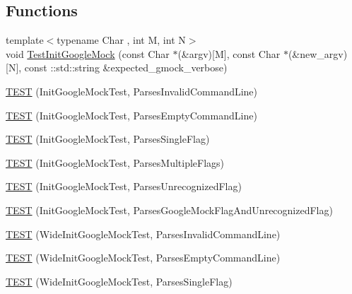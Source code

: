 \subsection*{Functions}
\begin{DoxyCompactItemize}
\item 
{\footnotesize template$<$typename Char , int M, int N$>$ }\\void \mbox{\hyperlink{googletest-master_2googlemock_2test_2gmock__test_8cc_ac9c8ae8722c330d47f75dee43fb8ab78}{Test\+Init\+Google\+Mock}} (const Char $\ast$(\&argv)\mbox{[}M\mbox{]}, const Char $\ast$(\&new\+\_\+argv)\mbox{[}N\mbox{]}, const \+::std\+::string \&expected\+\_\+gmock\+\_\+verbose)
\item 
\mbox{\hyperlink{googletest-master_2googlemock_2test_2gmock__test_8cc_a7c86c6c98b72e903135c1b01370a13f3}{T\+E\+ST}} (Init\+Google\+Mock\+Test, Parses\+Invalid\+Command\+Line)
\item 
\mbox{\hyperlink{googletest-master_2googlemock_2test_2gmock__test_8cc_a29b51be89eb52fa64713438ecf4ab924}{T\+E\+ST}} (Init\+Google\+Mock\+Test, Parses\+Empty\+Command\+Line)
\item 
\mbox{\hyperlink{googletest-master_2googlemock_2test_2gmock__test_8cc_ae24e1f90eac538406a16306612d7c380}{T\+E\+ST}} (Init\+Google\+Mock\+Test, Parses\+Single\+Flag)
\item 
\mbox{\hyperlink{googletest-master_2googlemock_2test_2gmock__test_8cc_af2ebcdde7f19ba9d002c20673e41fb97}{T\+E\+ST}} (Init\+Google\+Mock\+Test, Parses\+Multiple\+Flags)
\item 
\mbox{\hyperlink{googletest-master_2googlemock_2test_2gmock__test_8cc_ada1ddcc67dc056492a76fa398429038f}{T\+E\+ST}} (Init\+Google\+Mock\+Test, Parses\+Unrecognized\+Flag)
\item 
\mbox{\hyperlink{googletest-master_2googlemock_2test_2gmock__test_8cc_aea344ddf9b83f7912dde4f8e7adbd4e2}{T\+E\+ST}} (Init\+Google\+Mock\+Test, Parses\+Google\+Mock\+Flag\+And\+Unrecognized\+Flag)
\item 
\mbox{\hyperlink{googletest-master_2googlemock_2test_2gmock__test_8cc_ad66fde04be818693ebdcdcfc9943d57f}{T\+E\+ST}} (Wide\+Init\+Google\+Mock\+Test, Parses\+Invalid\+Command\+Line)
\item 
\mbox{\hyperlink{googletest-master_2googlemock_2test_2gmock__test_8cc_ad08ca27203202ca15cdf8eaaa7003ba7}{T\+E\+ST}} (Wide\+Init\+Google\+Mock\+Test, Parses\+Empty\+Command\+Line)
\item 
\mbox{\hyperlink{googletest-master_2googlemock_2test_2gmock__test_8cc_ab4288bcdb1b8464596f24c7384c72eb4}{T\+E\+ST}} (Wide\+Init\+Google\+Mock\+Test, Parses\+Single\+Flag)

\end{DoxyCompactItemize}
